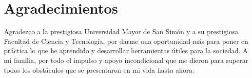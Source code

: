 \chapter{Agradecimientos}

Agradezco a la prestigiosa Universidad Mayor de San Simón y a su prestigiosa Facultad de Ciencia y Tecnología, por darme una oportunidad más para poner en práctica lo que he aprendido y desarrollar herramientas útiles para la sociedad. A mi familia, por todo el impulso y apoyo incondicional que me dieron para superar todos los obstáculos que se presentaron en mi vida hasta ahora. \\